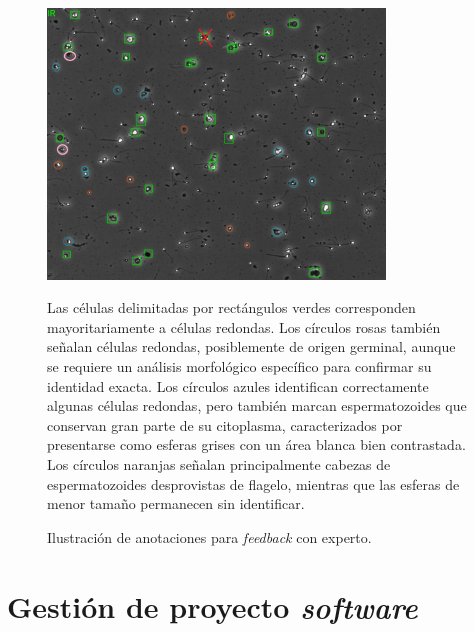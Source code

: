 \documentclass[12pt,a4paper,onecolumn,oneside]{report}
\begin{document}
\begin{figure}[H]
  \centering
  \includegraphics[width=0.8\textwidth]{figuras/rounds_cells/feedback_experto.png}
  \caption{Ilustración de anotaciones para \textit{feedback} con experto.}
  \label{fig:feedback_experto}
  Las células delimitadas por rectángulos verdes corresponden mayoritariamente a células redondas. Los círculos rosas también señalan células redondas, posiblemente de origen germinal, aunque se requiere un análisis morfológico específico para confirmar su identidad exacta.
  Los círculos azules identifican correctamente algunas células redondas, pero también marcan espermatozoides que conservan gran parte de su citoplasma, caracterizados por presentarse como esferas grises con un área blanca bien contrastada.
  Los círculos naranjas señalan principalmente cabezas de espermatozoides desprovistas de flagelo, mientras que las esferas de menor tamaño permanecen sin identificar.
\end{figure}

\chapter{Gestión de proyecto \textit{software}} %
\label{Gestión de proyecto software}
\end{document}
